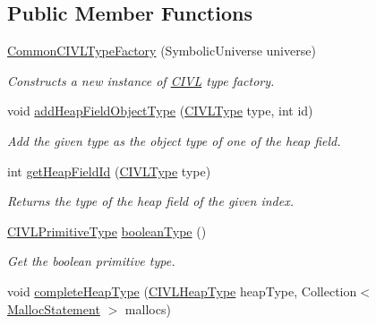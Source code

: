 \subsection*{Public Member Functions}
\begin{DoxyCompactItemize}
\item 
\hyperlink{classedu_1_1udel_1_1cis_1_1vsl_1_1civl_1_1model_1_1common_1_1CommonCIVLTypeFactory_afe5187dbc91bf61cd2d17c3c6d10a47a}{Common\+C\+I\+V\+L\+Type\+Factory} (Symbolic\+Universe universe)
\begin{DoxyCompactList}\small\item\em Constructs a new instance of \hyperlink{classedu_1_1udel_1_1cis_1_1vsl_1_1civl_1_1CIVL}{C\+I\+V\+L} type factory. \end{DoxyCompactList}\item 
void \hyperlink{classedu_1_1udel_1_1cis_1_1vsl_1_1civl_1_1model_1_1common_1_1CommonCIVLTypeFactory_aabaccc6826ea4cfa89f4bcfd87fd46bb}{add\+Heap\+Field\+Object\+Type} (\hyperlink{interfaceedu_1_1udel_1_1cis_1_1vsl_1_1civl_1_1model_1_1IF_1_1type_1_1CIVLType}{C\+I\+V\+L\+Type} type, int id)
\begin{DoxyCompactList}\small\item\em Add the given type as the object type of one of the heap field. \end{DoxyCompactList}\item 
int \hyperlink{classedu_1_1udel_1_1cis_1_1vsl_1_1civl_1_1model_1_1common_1_1CommonCIVLTypeFactory_a1f450da91e30db9ba3f1b1f1b90e1540}{get\+Heap\+Field\+Id} (\hyperlink{interfaceedu_1_1udel_1_1cis_1_1vsl_1_1civl_1_1model_1_1IF_1_1type_1_1CIVLType}{C\+I\+V\+L\+Type} type)
\begin{DoxyCompactList}\small\item\em Returns the type of the heap field of the given index. \end{DoxyCompactList}\item 
\hyperlink{interfaceedu_1_1udel_1_1cis_1_1vsl_1_1civl_1_1model_1_1IF_1_1type_1_1CIVLPrimitiveType}{C\+I\+V\+L\+Primitive\+Type} \hyperlink{classedu_1_1udel_1_1cis_1_1vsl_1_1civl_1_1model_1_1common_1_1CommonCIVLTypeFactory_aa8ee23e07a39d7f796c9b3897e448b37}{boolean\+Type} ()
\begin{DoxyCompactList}\small\item\em Get the boolean primitive type. \end{DoxyCompactList}\item 
void \hyperlink{classedu_1_1udel_1_1cis_1_1vsl_1_1civl_1_1model_1_1common_1_1CommonCIVLTypeFactory_a97cbac737d2beb0ddce81bf7eab74bdd}{complete\+Heap\+Type} (\hyperlink{interfaceedu_1_1udel_1_1cis_1_1vsl_1_1civl_1_1model_1_1IF_1_1type_1_1CIVLHeapType}{C\+I\+V\+L\+Heap\+Type} heap\+Type, Collection$<$ \hyperlink{interfaceedu_1_1udel_1_1cis_1_1vsl_1_1civl_1_1model_1_1IF_1_1statement_1_1MallocStatement}{Malloc\+Statement} $>$ mallocs)

\end{DoxyCompactItemize}
